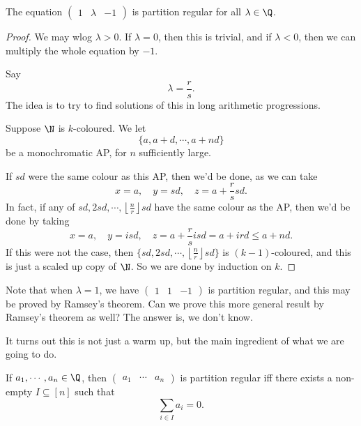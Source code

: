 \documentclass[a4paper]{article}
\begin{document}
\begin{prop}
  The equation $\begin{pmatrix}1 & \lambda & -1\end{pmatrix}$ is partition regular for all $\lambda \in \Q$.
\end{prop}

\begin{proof}
  We may wlog $\lambda > 0$. If $\lambda = 0$, then this is trivial, and if $\lambda < 0$, then we can multiply the whole equation by $-1$.

  Say
  \[
    \lambda = \frac{r}{s}.
  \]
  The idea is to try to find solutions of this in long arithmetic progressions.

  Suppose $\N$ is $k$-coloured. We let
  \[
    \{a, a + d, \cdots, a + nd\}
  \]
  be a monochromatic AP, for $n$ sufficiently large.

  If $sd$ were the same colour as this AP, then we'd be done, as we can take
  \[
    x = a,\quad y = sd,\quad z = a + \frac{r}{s} sd.
  \]
  In fact, if any of $sd, 2sd, \cdots, \left\lfloor\frac{n}{r}\right\rfloor sd$ have the same colour as the AP, then we'd be done by taking
  \[
    x = a,\quad y = isd,\quad z = a + \frac{r}{s} isd = a + ird \leq a + nd.
  \]
  If this were not the case, then $\{sd, 2sd, \cdots, \left\lfloor\frac{n}{r}\right\rfloor sd\}$ is $(k - 1)$-coloured, and this is just a scaled up copy of $\N$. So we are done by induction on $k$.
\end{proof}

Note that when $\lambda = 1$, we have $\begin{pmatrix}1 & 1 & -1\end{pmatrix}$ is partition regular, and this may be proved by Ramsey's theorem. Can we prove this more general result by Ramsey's theorem as well? The answer is, we don't know.

It turns out this is not just a warm up, but the main ingredient of what we are going to do.

\begin{thm}
  If $a_1,\cdots, a_n \in \Q$, then $\begin{pmatrix} a_1 & \cdots & a_n \end{pmatrix}$ is partition regular iff there exists a non-empty $I \subseteq [n]$ such that
  \[
    \sum_{i \in I} a_i = 0.
  \]
\end{thm}
\end{document}
